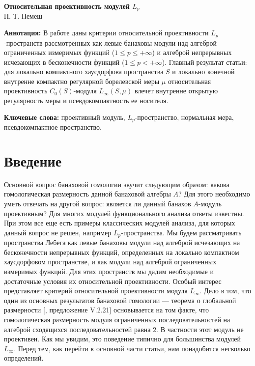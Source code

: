 \documentclass[12pt]{article}
\begin{document}
\begin{center}
    \Large \textbf{Относительная проективность модулей $L_p$}\\[0.5cm]
    \small {Н. Т. Немеш}
\end{center}

\thispagestyle{empty}

\medskip
\textbf{Аннотация:} В работе даны критерии относительной проективности
$L_p$-пространств рассмотренных как левые банаховы модули над алгеброй
ограниченных измеримых функций ($1\leq p\leq+\infty$) и алгеброй непрерывных
исчезающих в бесконечности функций ($1\leq p <+\infty$). Главный результат
статьи: для локально компактного хаусдорфова пространства $S$ и локально
конечной внутренне компактно регулярной борелевской меры $\mu$ относительная
проективность $C_0(S)$-модуля $L_\infty(S,\mu)$ влечет внутренне открытую
регулярность меры и псевдокомпактность ее носителя.

\medskip
\textbf{Ключевые слова:} проективный модуль, $L_p$-пространство, нормальная
мера, псевдокомпактное пространство.

\bigskip


\section{Введение}\label{SectionIntroduction}

Основной вопрос банаховой гомологии звучит следующим образом: какова
гомологическая размерность данной банаховой алгебры $A$? Для этого необходимо
уметь отвечать на другой вопрос: является ли данный банахов $A$-модуль
проективным? Для многих модулей функционального анализа ответы известны. При
этом все еще есть примеры классических модулей анализа, для которых данный
вопрос не решен, например $L_p$-пространства. Мы будем рассматривать
пространства Лебега как левые банаховы модули над алгеброй исчезающих на
бесконечности непрерывных функций, определенных на локально компактном
хаусдорфовом пространстве, и как модули над алгеброй ограниченных измеримых
функций. Для этих пространств мы дадим необходимые и достаточные условия их
относительной проективности. Особый интерес представляет критерий относительной
проективности модуля $L_\infty$. Дело в том, что один из основных результатов
банаховой гомологии --- теорема о глобальной размерности
[\cite{HelHomolBanTopAlg}, предложение V.2.21] основывается на том факте, что
гомологическая размерность модуля ограниченных последовательностей на алгеброй
сходящихся последовательностей равна 2. В частности этот модуль не проективен.
Как мы увидим, это поведение типично для большинства модулей $L_\infty$. Перед
тем, как перейти к основной части статьи, нам понадобится несколько определений.
\end{document}
